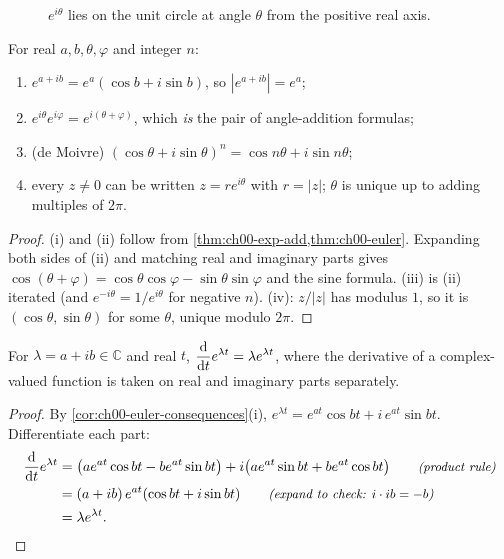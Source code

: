 \begin{figure}[ht]
  \centering
  
  \caption{$e^{i\theta}$ lies on the unit circle at angle $\theta$ from the
  positive real axis.}
  \label{fig:ch00-euler}
\end{figure}

\begin{corollary}\label{cor:ch00-euler-consequences}
For real $a,b,\theta,\varphi$ and integer $n$:
\begin{enumerate}[label=(\roman*)]
  \item $e^{a+ib} = e^a(\cos b + i\sin b)$, so $|e^{a+ib}| = e^a$;
  \item $e^{i\theta}e^{i\varphi} = e^{i(\theta+\varphi)}$, which \emph{is} the
        pair of angle-addition formulas;
  \item (de Moivre) $(\cos\theta + i\sin\theta)^n = \cos n\theta + i\sin n\theta$;
  \item every $z\neq 0$ can be written $z = re^{i\theta}$ with $r=|z|$; $\theta$
        is unique up to adding multiples of $2\pi$.
\end{enumerate}
\end{corollary}
\begin{proof}
(i) and (ii) follow from \cref{thm:ch00-exp-add,thm:ch00-euler}. Expanding
both sides of (ii) and matching real and imaginary parts gives
$\cos(\theta+\varphi) = \cos\theta\cos\varphi - \sin\theta\sin\varphi$ and the
sine formula. (iii) is (ii) iterated (and $e^{-i\theta} = 1/e^{i\theta}$ for
negative $n$). (iv): $z/|z|$ has modulus $1$, so it is $(\cos\theta,\sin\theta)$
for some $\theta$, unique modulo $2\pi$.
\end{proof}

\begin{proposition}\label{prop:ch00-deriv}
For $\lambda = a + ib\in\mathbb{C}$ and real $t$,
$\displaystyle\frac{\mathrm{d}}{\mathrm{d}t}e^{\lambda t} = \lambda e^{\lambda t}$, where the
derivative of a complex-valued function is taken on real and imaginary parts
separately.
\end{proposition}
\begin{proof}
By \cref{cor:ch00-euler-consequences}(i),
$e^{\lambda t} = e^{at}\cos bt + i\,e^{at}\sin bt$. Differentiate each part:
\begin{align*}
  \frac{\mathrm{d}}{\mathrm{d}t}e^{\lambda t}
  &= \bigl(ae^{at}\cos bt - be^{at}\sin bt\bigr)
   + i\bigl(ae^{at}\sin bt + be^{at}\cos bt\bigr) \qquad\text{\small\itshape(product rule)}\\
  &= (a + ib)\,e^{at}(\cos bt + i\sin bt)
     \qquad\text{\small\itshape(expand to check: $i\cdot ib = -b$)}\\
  &= \lambda e^{\lambda t}. \qedhere
\end{align*}
\end{proof}

